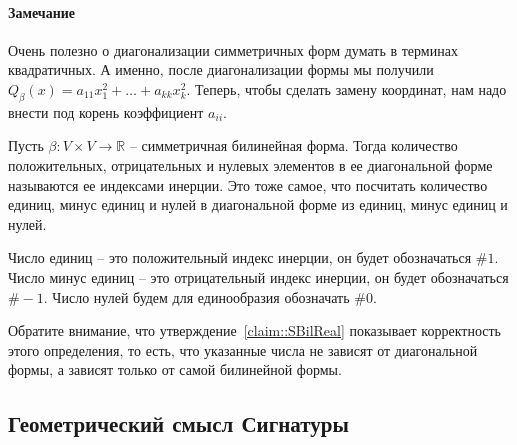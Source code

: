 \paragraph{Замечание}

Очень полезно о диагонализации симметричных форм думать в терминах квадратичных.
А именно, после диагонализации формы мы получили $Q_\beta(x) = a_{11}x_1^2 + \ldots +a_{kk}x_k^2$.
Теперь, чтобы сделать замену координат, нам надо внести под корень коэффициент $a_{ii}$.

\begin{definition}
Пусть $\beta\colon V\times V\to \mathbb R$ -- симметричная билинейная форма.
Тогда количество положительных, отрицательных и нулевых элементов в ее диагональной форме называются ее индексами инерции.
Это тоже самое, что посчитать количество единиц, минус единиц и нулей в диагональной форме из единиц, минус единиц и нулей.

Число единиц -- это положительный индекс инерции, он будет обозначаться $\#1$.
Число минус единиц -- это отрицательный индекс инерции, он будет обозначаться $\#-1$.
Число нулей будем для единообразия обозначать $\#0$.
\end{definition}

Обратите внимание, что утверждение~\ref{claim::SBilReal} показывает корректность этого определения, то есть, что указанные числа не зависят от диагональной формы, а зависят только от самой билинейной формы.



\subsection{Геометрический смысл Сигнатуры}

